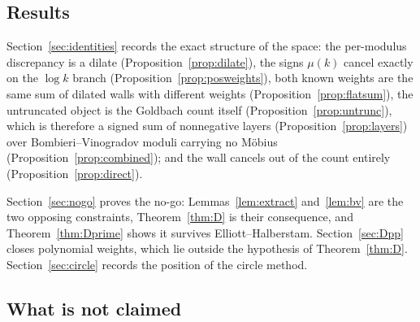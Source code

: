 \documentclass[11pt,a4paper]{article}
\theoremstyle{plain}
\theoremstyle{definition}
\theoremstyle{remark}
\begin{document}
\subsection{Results}

Section~\ref{sec:identities} records the exact structure of the space:
the per-modulus discrepancy is a dilate (Proposition~\ref{prop:dilate}),
the signs $\mu(k)$ cancel exactly on the $\log k$ branch
(Proposition~\ref{prop:posweights}), both known weights are the same
sum of dilated walls with different weights
(Proposition~\ref{prop:flatsum}), the untruncated object is the
Goldbach count itself (Proposition~\ref{prop:untrunc}), which is
therefore a signed sum of nonnegative layers
(Proposition~\ref{prop:layers}) over Bombieri--Vinogradov
moduli carrying no M\"obius (Proposition~\ref{prop:combined}); and
the wall cancels out of the count entirely
(Proposition~\ref{prop:direct}).

Section~\ref{sec:nogo} proves the no-go: Lemmas~\ref{lem:extract}
and~\ref{lem:bv} are the two opposing constraints,
Theorem~\ref{thm:D} is their consequence, and
Theorem~\ref{thm:Dprime} shows it survives Elliott--Halberstam.
Section~\ref{sec:Dpp} closes polynomial weights, which lie outside
the hypothesis of Theorem~\ref{thm:D}. Section~\ref{sec:circle}
records the position of the circle method.

\subsection{What is not claimed}\label{sec:notclaimed}
\end{document}
